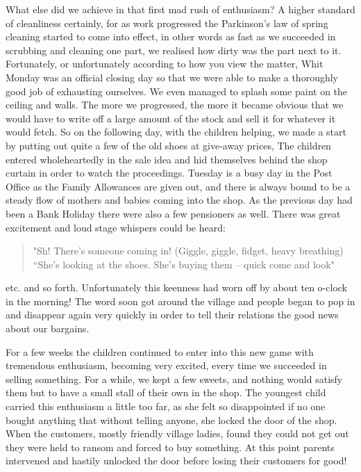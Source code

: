 What else did we achieve in that first mad rush of enthusiasm? A higher standard of cleanliness certainly, for as work progressed the Parkinson's law of spring cleaning started to come into effect, in other words as fast as we succeeded in scrubbing and cleaning one part, we realised how dirty was the part next to it. Fortunately, or unfortunately according to how you view the matter, Whit Monday was an official closing day so that we were able to make a thoroughly good job of exhausting ourselves. We even managed to splash some paint on the ceiling and walls. The more we progressed, the more it became obvious that we would have to write off a large amount of the stock and sell it for whatever it would fetch. So on the following day, with the children helping, we made a start by putting out quite a few of the old shoes at give-away prices, The children entered wholeheartedly in the sale idea and hid themselves behind the shop curtain in order to watch the proceedings. Tuesday is a busy day in the Post Office as the Family Allowances are given out, and there is always bound to be a steady flow of mothers and babies coming into the shop. As the previous day had been a Bank Holiday there were also a few pensioners as well. There was great excitement and loud stage whispers could be heard:

\begin{quote}
"Sh! There's someone coming in! (Giggle, giggle, fidget, heavy breathing) \\
“She's looking at the shoes. She's buying them – quick come and look"
\end{quote}

etc. and so forth. Unfortunately this keenness had worn off by about ten o-clock in the morning! The word soon got around the village and people began to pop in and disappear again very quickly in order to tell their relations the good news about our bargains.

For a few weeks the children continued to enter into this new game with tremendous enthusiasm, becoming very excited, every time we succeeded in selling something. For a while, we kept a few sweets, and nothing would satisfy them but to have a small stall of their own in the shop. The youngest child carried this enthusiasm a little too far, as she felt so disappointed if no one bought anything that without telling anyone, she locked the door of the shop. When the customers, mostly friendly village ladies, found they could not get out they were held to ransom and forced to buy something. At this point parents intervened and hastily unlocked the door before losing their customers for good!

